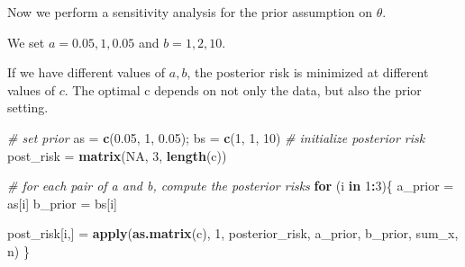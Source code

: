 \documentclass[
]{article}
\newenvironment{Shaded}{\begin{snugshade}}{\end{snugshade}}
\newcommand{\CommentTok}[1]{\textcolor[rgb]{0.56,0.35,0.01}{\textit{#1}}}
\newcommand{\ControlFlowTok}[1]{\textcolor[rgb]{0.13,0.29,0.53}{\textbf{#1}}}
\newcommand{\DecValTok}[1]{\textcolor[rgb]{0.00,0.00,0.81}{#1}}
\newcommand{\FloatTok}[1]{\textcolor[rgb]{0.00,0.00,0.81}{#1}}
\newcommand{\KeywordTok}[1]{\textcolor[rgb]{0.13,0.29,0.53}{\textbf{#1}}}
\newcommand{\NormalTok}[1]{#1}
\newcommand{\OperatorTok}[1]{\textcolor[rgb]{0.81,0.36,0.00}{\textbf{#1}}}
\newcommand{\OtherTok}[1]{\textcolor[rgb]{0.56,0.35,0.01}{#1}}
\newcommand{\StringTok}[1]{\textcolor[rgb]{0.31,0.60,0.02}{#1}}
\begin{document}
Now we perform a sensitivity analysis for the prior assumption on
\(\theta\).

We set \(a = 0.05, 1, 0.05\) and \(b = 1, 2, 10\).

If we have different values of \(a,b\), the posterior risk is minimized
at different values of \(c\). The optimal c depends on not only the
data, but also the prior setting.

\begin{Shaded}
\begin{Highlighting}[]
\CommentTok{# set prior}
\NormalTok{as =}\StringTok{ }\KeywordTok{c}\NormalTok{(}\FloatTok{0.05}\NormalTok{, }\DecValTok{1}\NormalTok{, }\FloatTok{0.05}\NormalTok{); bs =}\StringTok{ }\KeywordTok{c}\NormalTok{(}\DecValTok{1}\NormalTok{, }\DecValTok{1}\NormalTok{, }\DecValTok{10}\NormalTok{)}
\CommentTok{# initialize posterior risk}
\NormalTok{post_risk =}\StringTok{ }\KeywordTok{matrix}\NormalTok{(}\OtherTok{NA}\NormalTok{, }\DecValTok{3}\NormalTok{, }\KeywordTok{length}\NormalTok{(c))}

\CommentTok{# for each pair of a and b, compute the posterior risks}
\ControlFlowTok{for}\NormalTok{ (i }\ControlFlowTok{in} \DecValTok{1}\OperatorTok{:}\DecValTok{3}\NormalTok{)\{}
\NormalTok{  a_prior =}\StringTok{ }\NormalTok{as[i]}
\NormalTok{  b_prior =}\StringTok{ }\NormalTok{bs[i]}
  
\NormalTok{  post_risk[i,] =}\StringTok{ }\KeywordTok{apply}\NormalTok{(}\KeywordTok{as.matrix}\NormalTok{(c), }\DecValTok{1}\NormalTok{, posterior_risk, a_prior, b_prior, sum_x, n)}
\NormalTok{\}}


\end{Highlighting}
\end{Shaded}
\end{document}
